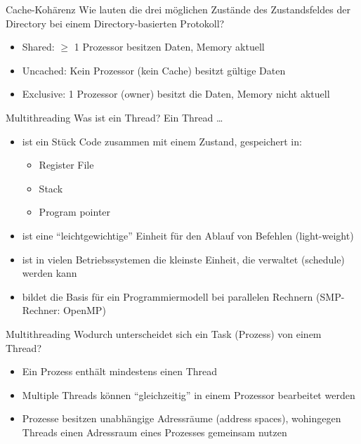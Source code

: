 \begin{aufgabe}{Cache-Kohärenz}
    Wie lauten die drei möglichen Zustände des Zustandsfeldes der Directory bei einem Directory-basierten Protokoll?
    \tcblower
    \begin{itemize}
        \item Shared: $\geq$ 1 Prozessor besitzen Daten, Memory aktuell
        \item Uncached: Kein Prozessor (kein Cache) besitzt gültige Daten
        \item Exclusive: 1 Prozessor (owner) besitzt die Daten, Memory nicht aktuell
    \end{itemize}
\end{aufgabe}

\begin{aufgabe}{Multithreading}
    Was ist ein Thread?
    \tcblower
    Ein Thread \ldots
    \begin{itemize}[$\ldots$]
        \item ist ein Stück Code zusammen mit einem Zustand, gespeichert in:
              \begin{itemize}
                  \item Register File
                  \item Stack
                  \item Program pointer
              \end{itemize}
        \item ist eine \enquote{leichtgewichtige} Einheit für den Ablauf von Befehlen (light-weight)
        \item ist in vielen Betriebssystemen die kleinste Einheit, die verwaltet (schedule) werden kann
        \item bildet die Basis für ein Programmiermodell bei parallelen Rechnern (SMP-Rechner: OpenMP)
    \end{itemize}
\end{aufgabe}

\begin{aufgabe}{Multithreading}
    Wodurch unterscheidet sich ein Task (Prozess) von einem Thread?
\tcblower
    \begin{itemize}
        \item Ein Prozess enthält mindestens einen Thread
        \item Multiple Threads können \enquote{gleichzeitig} in einem Prozessor bearbeitet werden
        \item Prozesse besitzen unabhängige Adressräume (address spaces), wohingegen Threads einen Adressraum eines Prozesses gemeinsam nutzen
    \end{itemize}
\end{aufgabe}